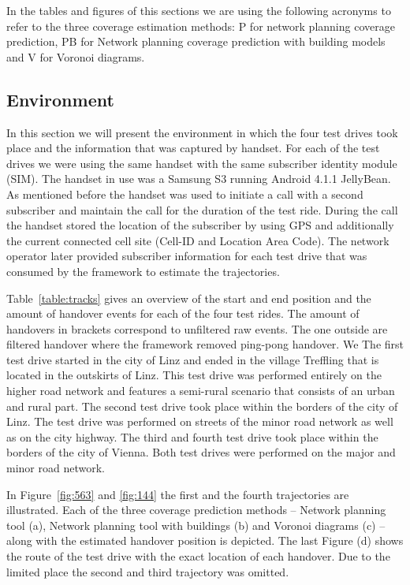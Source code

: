 In the tables and figures of this sections we are using the following acronyms to refer to the three coverage estimation methods: P for network planning coverage prediction, PB for Network planning coverage prediction with building models and V for Voronoi diagrams.
\subsection{Environment}
In this section we will present the environment in which the four test drives took place and the information that was captured by handset. For each of the test drives we were using the same handset with the same subscriber identity module (SIM). The handset in use was a Samsung S3 running Android 4.1.1 JellyBean. As mentioned before the handset was used to initiate a call with a second subscriber and maintain the call for the duration of the test ride. During the call the handset stored the location of the subscriber by using GPS and additionally the current connected cell site (Cell-ID and Location Area Code). The network operator later provided subscriber information for each test drive that was consumed by the framework to estimate the trajectories.

Table~\ref{table:tracks} gives an overview of the start and end position and the amount of handover events for each of the four test rides. The amount of handovers in brackets correspond to unfiltered raw events. The one outside are filtered handover where the framework removed ping-pong handover. We  The first test drive started in the city of Linz and ended in the village Treffling that is located in the outskirts of Linz. This test drive was performed entirely on the higher road network and features a semi-rural scenario that consists of an urban and rural part. The second test drive took place within the borders of the city of Linz. The test drive was performed on streets of the minor road network as well as on the city highway. The third and fourth test drive took place within the borders of the city of Vienna. Both test drives were performed on the major and minor road network.

In Figure~\ref{fig:563} and \ref{fig:144} the first and the fourth trajectories are illustrated. Each of the three coverage prediction methods -- Network planning tool (a), Network planning tool with buildings (b) and Voronoi diagrams (c) -- along with the estimated handover position is depicted. The last Figure (d) shows the route of the test drive with the exact location of each handover. Due to the limited place the second and third trajectory was omitted.

